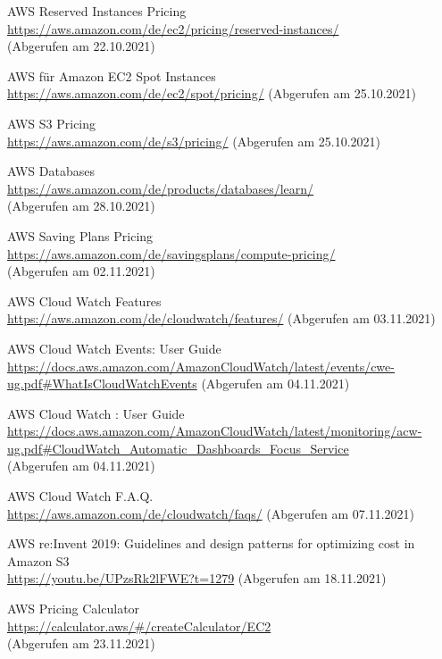 \begin{thebibliography}{HR08}
  AWS Reserved Instances Pricing\\
  \url{https://aws.amazon.com/de/ec2/pricing/reserved-instances/}\\
  (Abgerufen am 22.10.2021)

   AWS für Amazon EC2 Spot Instances\\
  \url{https://aws.amazon.com/de/ec2/spot/pricing/}
  (Abgerufen am 25.10.2021)

   AWS S3 Pricing\\
  \url{https://aws.amazon.com/de/s3/pricing/}
  (Abgerufen am 25.10.2021)

   AWS Databases\\
  \url{https://aws.amazon.com/de/products/databases/learn/}\\
  (Abgerufen am 28.10.2021)

   AWS Saving Plans Pricing\\
  \url{https://aws.amazon.com/de/savingsplans/compute-pricing/}\\
  (Abgerufen am 02.11.2021)

   AWS Cloud Watch Features\\
  \url{https://aws.amazon.com/de/cloudwatch/features/}
  (Abgerufen am 03.11.2021)


   AWS Cloud Watch Events: User Guide\\
  \url{https://docs.aws.amazon.com/AmazonCloudWatch/latest/events/cwe-ug.pdf#WhatIsCloudWatchEvents}
  (Abgerufen am 04.11.2021)

 AWS Cloud Watch : User Guide\\
  \url{https://docs.aws.amazon.com/AmazonCloudWatch/latest/monitoring/acw-ug.pdf#CloudWatch_Automatic_Dashboards_Focus_Service}
  \\(Abgerufen am 04.11.2021)

 AWS Cloud Watch F.A.Q.\\
  \url{https://aws.amazon.com/de/cloudwatch/faqs/}
  (Abgerufen am 07.11.2021)

 AWS re:Invent 2019: Guidelines and design patterns for optimizing cost in Amazon S3\\
  \url{https://youtu.be/UPzsRk2lFWE?t=1279}
  (Abgerufen am 18.11.2021)

 AWS Pricing Calculator\\
  \url{https://calculator.aws/#/createCalculator/EC2}\\
  (Abgerufen am 23.11.2021)
  

\end{thebibliography}
